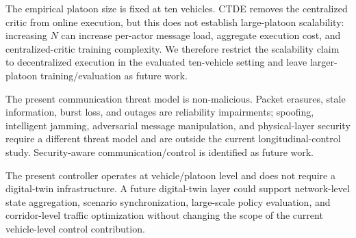 \documentclass{ieeeaccess}
\begin{document}
The empirical platoon size is fixed at ten vehicles. CTDE removes the centralized critic from online execution, but this does not establish large-platoon scalability: increasing $N$ can increase per-actor message load, aggregate execution cost, and centralized-critic training complexity. We therefore restrict the scalability claim to decentralized execution in the evaluated ten-vehicle setting and leave larger-platoon training/evaluation as future work.

The present communication threat model is non-malicious. Packet erasures, stale information, burst loss, and outages are reliability impairments; spoofing, intelligent jamming, adversarial message manipulation, and physical-layer security require a different threat model and are outside the current longitudinal-control study. Security-aware communication/control is identified as future work.

The present controller operates at vehicle/platoon level and does not require a digital-twin infrastructure. A future digital-twin layer could support network-level state aggregation, scenario synchronization, large-scale policy evaluation, and corridor-level traffic optimization without changing the scope of the current vehicle-level control contribution.
\end{document}
